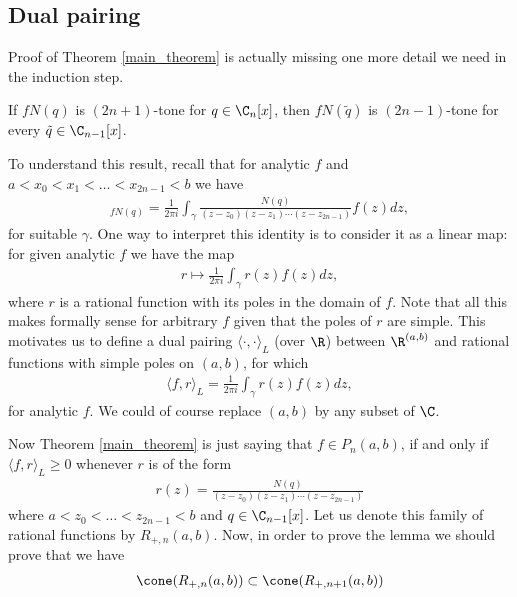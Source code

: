 \subsection{Dual pairing}\label{dual_pairing_section}

Proof of Theorem \ref{main_theorem} is actually missing one more detail we need in the induction step.

\begin{lem}\label{k_tone_cor}
	If $f N(q)$ is $(2 n + 1)$-tone for $q \in \C_{n}[x]$, then $f N(\tilde{q})$ is $(2 n - 1)$-tone for every $\tilde{q} \in \C_{n - 1}[x]$.
\end{lem}

To understand this result, recall that for analytic $f$ and $a < x_{0} < x_{1} < \ldots < x_{2 n - 1} < b$ we have
\begin{align*}
	[x_{0}, x_{1}, \ldots, x_{2 n - 1}]_{f N(q)} = \frac{1}{2 \pi i} \int_{\gamma} \frac{N(q)}{(z - z_{0}) (z - z_{1}) \cdots (z - z_{2 n - 1})} f(z) dz,
\end{align*}
for suitable $\gamma$. One way to interpret this identity is to consider it as a linear map: for given analytic $f$ we have the map
\begin{align*}
	r \mapsto  \frac{1}{2 \pi i} \int_{\gamma} r(z) f(z) dz,
\end{align*}
where $r$ is a rational function with its poles in the domain of $f$. Note that all this makes formally sense for arbitrary $f$ given that the poles of $r$ are simple. This motivates us to define a dual pairing $\langle \cdot, \cdot \rangle_{L}$ (over $\R$) between $\R^{(a, b)}$ and rational functions with simple poles on $(a, b)$, for which
\begin{align*}
	\langle f, r \rangle_{L} = \frac{1}{2 \pi i} \int_{\gamma} r(z) f(z) dz,
\end{align*}
for analytic $f$. We could of course replace $(a, b)$ by any subset of $\C$.

Now Theorem \ref{main_theorem} is just saying that $f \in P_{n}(a, b)$, if and only if $\langle f, r \rangle_{L} \geq 0$ whenever $r$ is of the form
\begin{align*}
	r(z) = \frac{N(q)}{(z - z_{0}) (z - z_{1}) \cdots (z - z_{2 n - 1})}
\end{align*}
where $a < z_{0} < \ldots < z_{2 n - 1} < b$ and $q \in \C_{n - 1}[x]$. Let us denote this family of rational functions by $R_{+, n}(a, b)$. Now, in order to prove the lemma we should prove that we have
\begin{align*}
	\cone(R_{+, n}(a, b)) \subset \cone(R_{+, n + 1}(a, b))
\end{align*}

